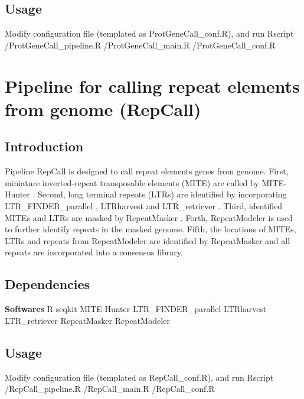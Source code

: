 \documentclass[11pt]{article}
\begin{document}
\begin{sloppypar}
\subsection{Usage}
Modify configuration file (templated as ProtGeneCall\_conf.R), and run \newline
Rscript /ProtGeneCall\_pipeline.R /ProtGeneCall\_main.R /ProtGeneCall\_conf.R

\section{Pipeline for calling repeat elements from genome (RepCall)}
\subsection{Introduction}
Pipeline RepCall is designed to call repeat elements genes from genome. 
First, miniature inverted-repeat transposable elements (MITE) are called by MITE-Hunter \parencite{han2010mite}. 
Second, long terminal repeats (LTRs) are identified by incorporating LTR\_FINDER\_parallel \parencite{ou2019ltr_finder_parallel}, LTRharvest \parencite{ellinghaus2008ltrharvest} and LTR\_retriever \parencite{ou2018ltr_retriever}. 
Third, identified MITEs and LTRs are masked by RepeatMasker \parencite{smit2015repeatmasker}. 
Forth, RepeatModeler \parencite{smit2015repeatmodeler} is used to further identify repeats in the masked genome. 
Fifth, the locations of MITEs, LTRs and repeats from RepeatModeler are identified by RepeatMasker and all repeats are incorporated into a consensus library. 
\subsection{Dependencies}
\textbf{Softwares} \newline
R \newline
seqkit \newline
MITE-Hunter \newline
LTR\_FINDER\_parallel \newline
LTRharvest \newline
LTR\_retriever \newline
RepeatMasker \newline
RepeatModeler \newline
\par
\subsection{Usage}
Modify configuration file (templated as RepCall\_conf.R), and run \newline
Rscript /RepCall\_pipeline.R /RepCall\_main.R /RepCall\_conf.R


\end{sloppypar}
\end{document}
